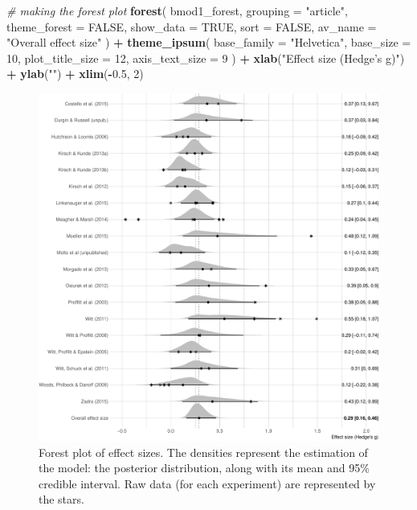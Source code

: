 \documentclass[floatsintext,doc]{apa6}
\newenvironment{Shaded}{\begin{snugshade}}{\end{snugshade}}
\newcommand{\CommentTok}[1]{\textcolor[rgb]{0.56,0.35,0.01}{\textit{#1}}}
\newcommand{\DataTypeTok}[1]{\textcolor[rgb]{0.13,0.29,0.53}{#1}}
\newcommand{\DecValTok}[1]{\textcolor[rgb]{0.00,0.00,0.81}{#1}}
\newcommand{\FloatTok}[1]{\textcolor[rgb]{0.00,0.00,0.81}{#1}}
\newcommand{\KeywordTok}[1]{\textcolor[rgb]{0.13,0.29,0.53}{\textbf{#1}}}
\newcommand{\NormalTok}[1]{#1}
\newcommand{\OperatorTok}[1]{\textcolor[rgb]{0.81,0.36,0.00}{\textbf{#1}}}
\newcommand{\OtherTok}[1]{\textcolor[rgb]{0.56,0.35,0.01}{#1}}
\newcommand{\StringTok}[1]{\textcolor[rgb]{0.31,0.60,0.02}{#1}}
\begin{document}
\begin{Shaded}
\begin{Highlighting}[]
\CommentTok{# making the forest plot}
\KeywordTok{forest}\NormalTok{(}
\NormalTok{    bmod1_forest, }\DataTypeTok{grouping =} \StringTok{"article"}\NormalTok{, }\DataTypeTok{theme_forest =} \OtherTok{FALSE}\NormalTok{,}
    \DataTypeTok{show_data =} \OtherTok{TRUE}\NormalTok{, }\DataTypeTok{sort =} \OtherTok{FALSE}\NormalTok{, }\DataTypeTok{av_name =} \StringTok{"Overall effect size"}
\NormalTok{    ) }\OperatorTok{+}
\StringTok{    }\KeywordTok{theme_ipsum}\NormalTok{(}
        \DataTypeTok{base_family =} \StringTok{"Helvetica"}\NormalTok{,}
        \DataTypeTok{base_size =} \DecValTok{10}\NormalTok{, }\DataTypeTok{plot_title_size =} \DecValTok{12}\NormalTok{, }\DataTypeTok{axis_text_size =} \DecValTok{9}
\NormalTok{        ) }\OperatorTok{+}
\StringTok{    }\KeywordTok{xlab}\NormalTok{(}\StringTok{"Effect size (Hedge's g)"}\NormalTok{) }\OperatorTok{+}
\StringTok{    }\KeywordTok{ylab}\NormalTok{(}\StringTok{""}\NormalTok{) }\OperatorTok{+}
\StringTok{    }\KeywordTok{xlim}\NormalTok{(}\OperatorTok{-}\FloatTok{0.5}\NormalTok{, }\DecValTok{2}\NormalTok{)}
\end{Highlighting}
\end{Shaded}

\begin{figure}
\centering
\includegraphics{supplementary_materials_files/figure-latex/forest-1.pdf}
\caption{\label{fig:forest}Forest plot of effect sizes. The densities represent the estimation of the model: the posterior distribution, along with its mean and 95\% credible interval. Raw data (for each experiment) are represented by the stars.}
\end{figure}
\end{document}
